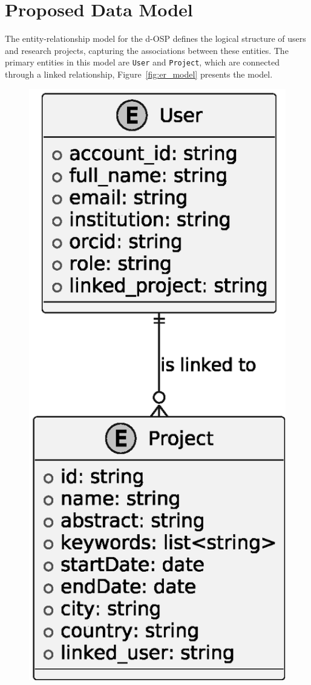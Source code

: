 \documentclass[final]{rc-book-2.14}
\begin{document}
\section{Proposed Data Model}
\label{chp:proposed_model:sec:data_model}

The entity-relationship model for the d-OSP defines the logical structure of users and research projects, capturing the associations between these entities. The primary entities in this model are \texttt{User} and \texttt{Project}, which are connected through a linked relationship, Figure~\ref{fig:er_model} presents the model.


\begin{figure}[htbp]
    \centering
    \includegraphics[scale=0.5]{fig/entity_relationship_model.eps}

\end{figure}
\end{document}

